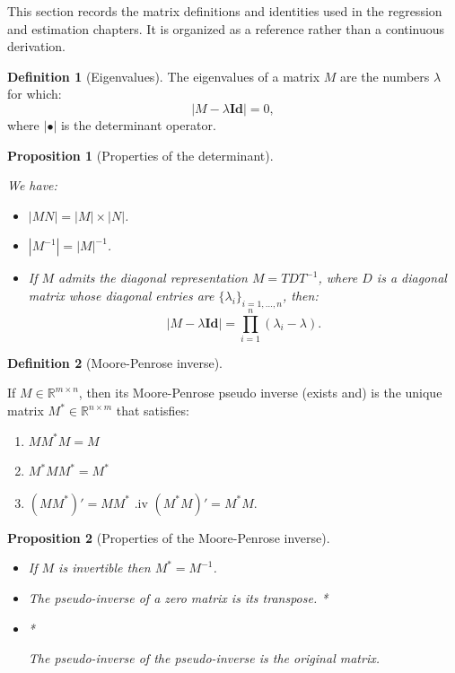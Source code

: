\documentclass[
  11pt,
]{book}
\providecommand{\tightlist}{%
  \setlength{\itemsep}{0pt}\setlength{\parskip}{0pt}}
\newtheorem{proposition}{Proposition}[chapter]
\theoremstyle{definition}
\newtheorem{definition}{Definition}[chapter]
\theoremstyle{definition}
\theoremstyle{definition}
\theoremstyle{definition}
\theoremstyle{remark}
\begin{document}
This section records the matrix definitions and identities used in the regression and estimation chapters. It is organized as a reference rather than a continuous derivation.

\begin{definition}[Eigenvalues]
\protect\hypertarget{def:eigenvalues}{}\label{def:eigenvalues}The eigenvalues of a matrix \(M\) are the numbers \(\lambda\) for which:
\[
|M - \lambda \mathbf{Id}| = 0,
\]
where \(| \bullet |\) is the determinant operator.
\end{definition}

\begin{proposition}[Properties of the determinant]
\protect\hypertarget{prp:determinant}{}\label{prp:determinant}

We have:

\begin{itemize}
\tightlist
\item
  \(|MN|=|M|\times|N|\).
\item
  \(|M^{-1}|=|M|^{-1}\).
\item
  If \(M\) admits the diagonal representation \(M=TDT^{-1}\), where \(D\) is a diagonal matrix whose diagonal entries are \(\{\lambda_i\}_{i=1,\dots,n}\), then:
  \[
  |M - \lambda \mathbf{Id} |=\prod_{i=1}^n (\lambda_i - \lambda).
  \]
\end{itemize}

\end{proposition}

\begin{definition}[Moore-Penrose inverse]
\protect\hypertarget{def:MoorPenrose}{}\label{def:MoorPenrose}

If \(M \in \mathbb{R}^{m \times n}\), then its Moore-Penrose pseudo inverse (exists and) is the unique matrix \(M^*  \in \mathbb{R}^{n \times m}\) that satisfies:

\begin{enumerate}
\def\labelenumi{\roman{enumi}.}
\tightlist
\item
  \(M M^* M = M\)
\item
  \(M^* M M^* = M^*\)
\item
  \((M M^*)'=M M^*\)
  .iv \((M^* M)'=M^* M\).
\end{enumerate}

\end{definition}

\begin{proposition}[Properties of the Moore-Penrose inverse]
\protect\hypertarget{prp:MoorPenrose-properties}{}\label{prp:MoorPenrose-properties}\leavevmode

\begin{itemize}
\tightlist
\item
  If \(M\) is invertible then \(M^* = M^{-1}\).
\item
  The pseudo-inverse of a zero matrix is its transpose.
  *

  \item*

  The pseudo-inverse of the pseudo-inverse is the original matrix.
\end{itemize}

\end{proposition}
\end{document}
